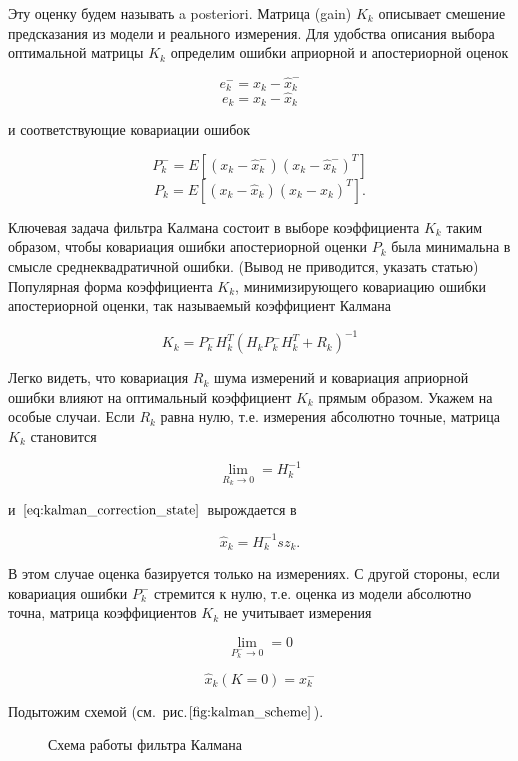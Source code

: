 \documentclass[12pt,a4paper]{article}
\begin{document}
Эту оценку будем называть a posteriori. Матрица (gain) $K_k$ описывает смешение предсказания из модели и реального измерения. Для удобства описания выбора оптимальной матрицы $K_k$ определим ошибки априорной и апостериорной оценок

$$ e_k^- = x_k - \hat{x}_k^- $$
$$ e_k = x_k - \hat{x}_k $$

и соответствующие ковариации ошибок

$$ P_k^- = E[(x_k - \hat{x}_k^-)(x_k - \hat{x}_k^-)^T] $$
$$ P_k = E[(x_k - \hat{x}_k)(x_k - \hat{x}_k)^T] . $$

Ключевая задача фильтра Калмана состоит в выборе коэффициента $K_k$ таким образом, чтобы ковариация ошибки апостериорной оценки $P_k$ была минимальна в смысле среднеквадратичной ошибки. (Вывод не приводится, указать статью) Популярная форма коэффициента $K_k$, минимизирующего ковариацию ошибки апостериорной оценки, так называемый коэффициент Калмана

$$ K_k = P_k^-  H_k^T (H_k P_k^- H_k^T + R_k)^{-1}$$

Легко видеть, что ковариация $R_k$ шума измерений и ковариация априорной ошибки влияют на оптимальный коэффициент $K_k$ прямым образом. Укажем на особые случаи. Если $R_k$ равна нулю, т.е. измерения абсолютно точные, матрица $K_k$ становится

$$ \lim\limits_{R_k\to0} = H_k^{-1} $$

и $\eqref{eq:kalman_correction_state}$ вырождается в 

$$ \hat x_k = H_k^{-1}s z_k. $$

В этом случае оценка базируется только на измерениях. С другой стороны, если ковариация ошибки $P_k^-$ стремится к нулю, т.е. оценка из модели абсолютно точна, матрица коэффициентов $K_k$ не учитывает измерения

$$ \lim\limits_{P_k^-\to0} = 0 $$

$$ \hat x_k(K = 0) = x_k^- $$

Подытожим схемой (см.~рис.$\ref{fig:kalman_scheme}$).

\begin{figure}
	\caption{Схема работы фильтра Калмана}
	\label{fig:kalman_scheme}
\end{figure}
\end{document}
